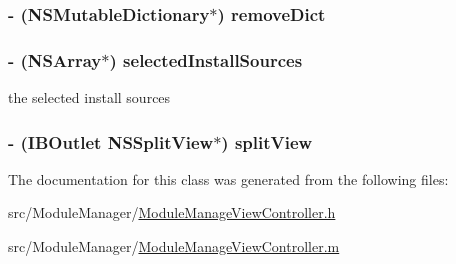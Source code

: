 \hypertarget{interface_module_manage_view_controller_a6092088ba4a960f7f295d9e7c6267d9d}{
\subsubsection[{remove\-Dict}]{\setlength{\rightskip}{0pt plus 5cm}-\/ (N\-S\-Mutable\-Dictionary$\ast$) remove\-Dict\hspace{0.3cm}{\ttfamily [protected]}}}\label{interface_module_manage_view_controller_a6092088ba4a960f7f295d9e7c6267d9d}
\hypertarget{interface_module_manage_view_controller_a8973007d714a25dc92972d62e09dc726}{
\subsubsection[{selected\-Install\-Sources}]{\setlength{\rightskip}{0pt plus 5cm}-\/ (N\-S\-Array$\ast$) selected\-Install\-Sources\hspace{0.3cm}{\ttfamily [protected]}}}\label{interface_module_manage_view_controller_a8973007d714a25dc92972d62e09dc726}
the selected install sources \hypertarget{interface_module_manage_view_controller_ab462aed4314ed68bb91230e4fc88c781}{
\subsubsection[{split\-View}]{\setlength{\rightskip}{0pt plus 5cm}-\/ (I\-B\-Outlet N\-S\-Split\-View$\ast$) split\-View\hspace{0.3cm}{\ttfamily [protected]}}}\label{interface_module_manage_view_controller_ab462aed4314ed68bb91230e4fc88c781}


The documentation for this class was generated from the following files\-:\begin{DoxyCompactItemize}
\item 
src/\-Module\-Manager/\hyperlink{_module_manage_view_controller_8h}{Module\-Manage\-View\-Controller.\-h}\item 
src/\-Module\-Manager/\hyperlink{_module_manage_view_controller_8m}{Module\-Manage\-View\-Controller.\-m}\end{DoxyCompactItemize}
